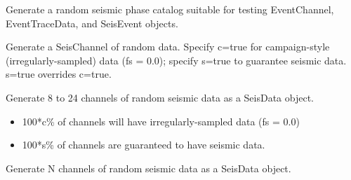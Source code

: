 \documentclass[letterpaper,11pt,english]{sphinxmanual}
\begin{document}
Generate a random seismic phase catalog suitable for testing EventChannel,
EventTraceData, and SeisEvent objects.

\begin{fulllineitems}
\label{\detokenize{src/Submodules/randseis:randSeisChannel}}
\end{fulllineitems}


Generate a SeisChannel of random data. Specify c=true for campaign-style
(irregularly-sampled) data (fs = 0.0); specify s=true to guarantee seismic data.
s=true overrides c=true.

\begin{fulllineitems}
\label{\detokenize{src/Submodules/randseis:randSeisData}}
\end{fulllineitems}


Generate 8 to 24 channels of random seismic data as a SeisData object.
\begin{itemize}
\item {} 
100*c\% of channels  will have irregularly-sampled data (fs = 0.0)

\item {} 
100*s\% of channels  are guaranteed to have seismic data.

\end{itemize}


\begin{fulllineitems}
\end{fulllineitems}


Generate N channels of random seismic data as a SeisData object.

\begin{fulllineitems}
\label{\detokenize{src/Submodules/randseis:randSeisEvent}}
\end{fulllineitems}
\end{document}
